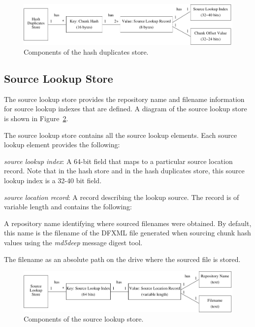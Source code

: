 \documentclass[12pt,twoside]{article}
\newcommand{\mdd}{\emph{md5deep}\xspace}
\begin{document}
\begin{figure}[h]
  \center
  \includegraphics{drawings/hash_duplicates_store}
  \caption{Components of the hash duplicates store.\label{fig-hash-duplicates-store}}
\end{figure}

\subsection{Source Lookup Store\label{source-lookup-store}}
The source lookup store provides the repository name and filename information
for source lookup indexes that are defined.
A diagram of the source lookup store is shown in Figure~\ref{fig-source-lookup-store}.

The source lookup store contains all the source lookup elements.
Each source lookup element provides the following:
\begin{compactitem}
\item \emph{source lookup index}: A 64-bit field
that maps to a particular source location record.
Note that in the hash store and in the hash duplicates store,
this source lookup index is a 32-40 bit field.
\item \emph{source location record}: A record describing the lookup source.
The record is of variable length and contains the following:
\begin{compactitem}
\item A repository name identifying where sourced filenames were obtained.
By default, this name is the filename of the DFXML file generated
when sourcing chunk hash values using the \mdd message digest tool.
\item The filename as an absolute path on the drive where the sourced file is stored.
\end{compactitem}
\end{compactitem}

\begin{figure}[h]
  \center
  \includegraphics{drawings/source_lookup_store}
  \caption{Components of the source lookup store.\label{fig-source-lookup-store}}
\end{figure}
\end{document}
